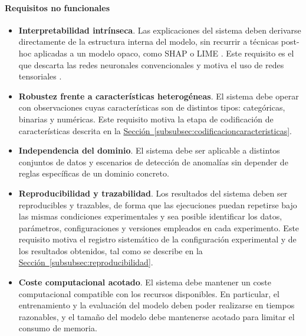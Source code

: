 \documentclass[12pt]{extarticle}
\numberwithin{equation}{section}
\begin{document}
\begin{refsection}
\paragraph{Requisitos no funcionales}
\label{par:requisitosnofuncionales}
\mbox{}

\begin{itemize}
    \item \textbf{Interpretabilidad intrínseca}. Las explicaciones del sistema deben derivarse directamente de la estructura interna del modelo, sin recurrir a técnicas post-hoc aplicadas a un modelo opaco, como SHAP \cite{lundberg2017unified} o LIME \cite{ribeiro2016should}. Este requisito es el que descarta las redes neuronales convencionales y motiva el uso de redes tensoriales \cite{ran2023tensor, aizpurua2025tensor}.
    
    \item \textbf{Robustez frente a características heterogéneas}. El sistema debe operar con observaciones cuyas características son de distintos tipos: categóricas, binarias y numéricas. Este requisito motiva la etapa de codificación de características descrita en la \hyperref[subsubsec:codificacioncaracteristicas]{Sección~\ref*{subsubsec:codificacioncaracteristicas}}.

    \item \textbf{Independencia del dominio}. El sistema debe ser aplicable a distintos conjuntos de datos y escenarios de detección de anomalías sin depender de reglas específicas de un dominio concreto.
    
    \item \textbf{Reproducibilidad y trazabilidad}. Los resultados del sistema deben ser reproducibles y trazables, de forma que las ejecuciones puedan repetirse bajo las mismas condiciones experimentales y sea posible identificar los datos, parámetros, configuraciones y versiones empleados en cada experimento. Este requisito motiva el registro sistemático de la configuración experimental y de los resultados obtenidos, tal como se describe en la \hyperref[subsubsec:reproducibilidad]{Sección~\ref*{subsubsec:reproducibilidad}}.
    
    \item \textbf{Coste computacional acotado}. El sistema debe mantener un coste computacional compatible con los recursos disponibles. En particular, el entrenamiento y la evaluación del modelo deben poder realizarse en tiempos razonables, y el tamaño del modelo debe mantenerse acotado para limitar el consumo de memoria.
\end{itemize}


\end{refsection}
\end{document}
